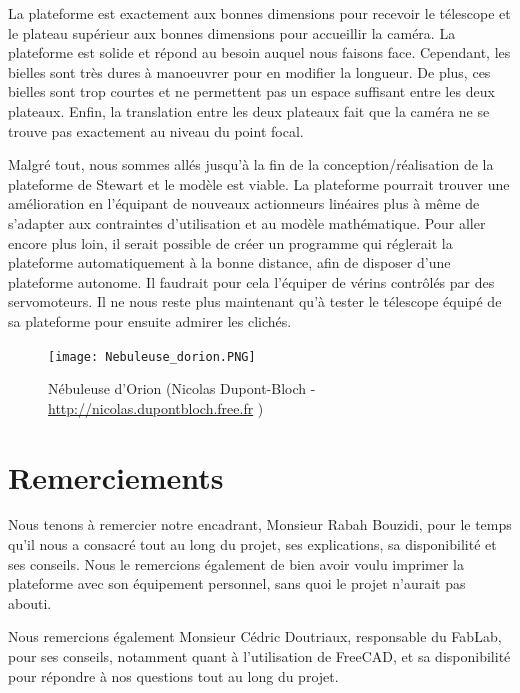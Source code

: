 \documentclass[a4paper,12pt]{article}
\begin{document}
\medskip

La plateforme est exactement aux bonnes dimensions pour recevoir le télescope et le
plateau supérieur aux bonnes dimensions pour accueillir la caméra. La plateforme est solide
et répond au besoin auquel nous faisons face. Cependant, les bielles sont
très dures à manoeuvrer pour en modifier la longueur. De plus, ces bielles sont trop courtes et ne permettent pas un espace suffisant entre les deux plateaux. Enfin, la translation entre les deux plateaux fait que la caméra ne se trouve pas exactement au niveau du point focal.

\medskip

Malgré tout, nous sommes allés jusqu'à la fin de la conception/réalisation de la plateforme de Stewart et le modèle est viable. La plateforme pourrait trouver une amélioration en l'équipant de nouveaux actionneurs linéaires plus à même de s'adapter aux contraintes d'utilisation et au modèle mathématique. Pour aller encore plus loin, il serait possible de créer un programme qui réglerait la plateforme automatiquement à la bonne distance, afin de disposer  d'une plateforme autonome. Il faudrait pour cela l'équiper de vérins contrôlés par des servomoteurs.
Il ne nous reste plus maintenant qu'à  tester le télescope équipé de sa plateforme pour ensuite admirer les clichés.


\begin{figure}[H]
  \centering
  \texttt{[image: Nebuleuse\_dorion.PNG]}
  \caption{Nébuleuse d'Orion (Nicolas Dupont-Bloch - \url{http://nicolas.dupontbloch.free.fr}
)}
\end{figure}

\newpage

\section{Remerciements}

Nous tenons à remercier notre encadrant, Monsieur Rabah Bouzidi, pour le temps qu'il nous a consacré tout au long du projet, ses explications, sa disponibilité et ses conseils. Nous le remercions également de bien avoir voulu imprimer la plateforme avec son équipement personnel, sans quoi le projet n'aurait pas abouti. 

\medskip

Nous remercions également Monsieur Cédric Doutriaux, responsable du FabLab, pour ses conseils, notamment quant à l'utilisation de FreeCAD, et sa disponibilité pour répondre à nos questions tout au long du projet.
\end{document}
